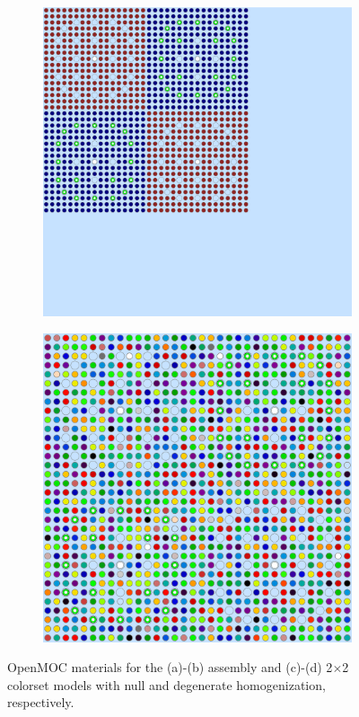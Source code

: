 \begin{figure}[h!]
\begin{subfigure}{0.45\textwidth}
  \centering
  \includegraphics[width=0.8\linewidth]{figures/reflector/geometry}
  \caption{}
  \label{fig:null-reflector}
\end{subfigure}
\begin{subfigure}{0.45\textwidth}
  \centering
  \includegraphics[width=0.8\linewidth]{figures/reflector/degenerate-materials}
  \caption{}
  \label{fig:degenerate-reflector}
\end{subfigure}
\caption{OpenMOC materials for the (a)-(b) assembly and (c)-(d) 2$\times$2 colorset models with null and degenerate homogenization, respectively.}
\label{fig:homogenization-schemes}
\end{figure}

